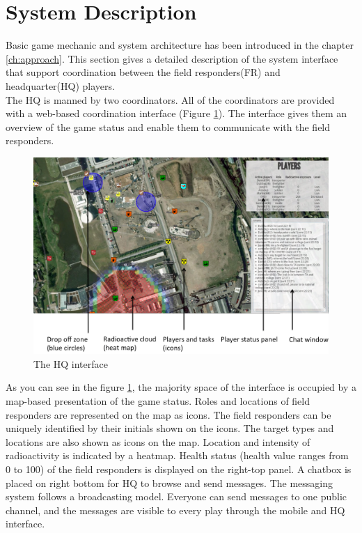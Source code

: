 \section{System Description}\label{sec:study3system}
Basic game mechanic and system architecture has been introduced in the chapter \ref{ch:approach}. This section gives a detailed description of the system interface that support coordination between the field responders(FR) and headquarter(HQ) players. \\

The HQ is manned by two coordinators. All of the coordinators are provided with a web-based coordination interface (Figure \ref{fig:HQinterface}). The interface gives them an overview of the game status and enable them to communicate with the field responders. \\

\begin{figure}[h]
  \centering
  \includegraphics[width=1\textwidth]{img/study1/webinterface}
  \caption{The HQ interface}
  \label{fig:HQinterface}
\end{figure}

As you can see in the figure \ref{fig:HQinterface}, the majority space of the interface is occupied by a map-based presentation of the game status. Roles and locations of field responders are represented on the map as icons. The field responders can be uniquely identified by their initials shown on the icons. The target types and locations are also shown as icons on the map. Location and intensity of radioactivity is indicated by a heatmap. Health status (health value ranges from 0 to 100) of the field responders is displayed on the right-top panel. A chatbox is placed on right bottom for HQ to browse and send messages. The messaging system follows a broadcasting model. Everyone can send messages to one public channel, and the messages are visible to every play through the mobile and HQ interface.\\

